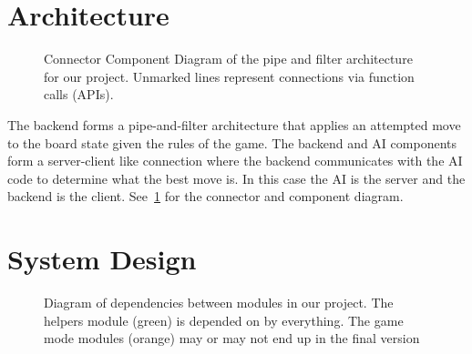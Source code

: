 \documentclass[11pt, oneside]{article}
\begin{document}
\section{Architecture}
\begin{figure}[H]\label{fig:CCD}
  \centering
  \caption{Connector Component Diagram of the pipe and filter architecture for
    our project. Unmarked lines represent connections via function calls
    (APIs).}
\end{figure}
The backend forms a pipe-and-filter architecture that applies an attempted move
to the board state given the rules of the game. The backend and AI components
form a server-client like connection where the backend communicates with the AI
code to determine what the best move is. In this case the AI is the server and
the backend is the client. See~\ref{fig:CCD} for the connector and component
diagram.

\section{System Design}
\begin{figure}[H]\label{fig:MDD}
  \centering
  \caption{Diagram of dependencies between modules in our project. The helpers
    module (green) is depended on by everything. The game mode modules (orange)
    may or may not end up in the final version}
\end{figure}
\end{document}
